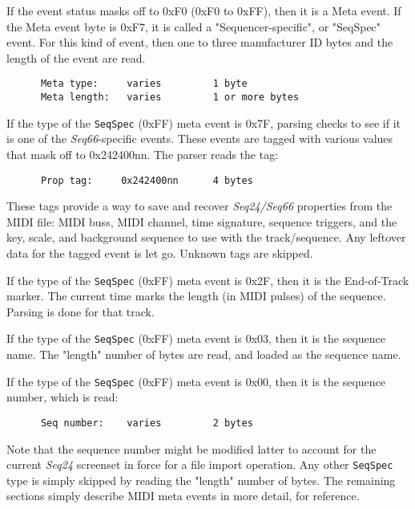    If the event status masks off to 0xF0 (0xF0 to 0xFF), then it is a Meta
   event.  If the Meta event byte is 0xF7, it is called a "Sequencer-specific",
   or "SeqSpec" event.  For this kind of event, then one to three manufacturer
   ID bytes and the length of the event are read.

   \begin{verbatim}
      Meta type:     varies         1 byte
      Meta length:   varies         1 or more bytes
   \end{verbatim}

   If the type of the
   \texttt{SeqSpec} (0xFF) meta event is 0x7F, parsing checks to see
   if it is one of the \textsl{Seq66}-specific events.  These events are tagged
   with various values that mask off to 0x242400nn.  The parser reads the
   tag:

   \begin{verbatim}
      Prop tag:     0x242400nn      4 bytes
   \end{verbatim}

   These tags provide a way to save and recover \textsl{Seq24/Seq66} properties
   from the MIDI file: MIDI buss, MIDI channel, time signature, sequence
   triggers, and the key, scale, and background sequence to use with the
   track/sequence.  Any leftover data for the tagged event is let go.
   Unknown tags are skipped.

   If the type of the
   \texttt{SeqSpec} (0xFF) meta event is 0x2F, then it is the
   End-of-Track marker.  The current time marks the length (in MIDI pulses) of
   the sequence.  Parsing is done for that track.

   If the type of the
   \texttt{SeqSpec} (0xFF) meta event is 0x03, then it is the
   sequence name.  The "length" number of bytes are read, and loaded as the
   sequence name.

   If the type of the
   \texttt{SeqSpec} (0xFF) meta event is 0x00, then it is the
   sequence number, which is read:

   \begin{verbatim}
      Seq number:    varies         2 bytes
   \end{verbatim}

   Note that the sequence number might be modified latter to account for the
   current \textsl{Seq24} screenset in force for a file import operation.
   Any other \texttt{SeqSpec} type is simply skipped by reading the "length"
   number of bytes.
   The remaining sections simply describe MIDI meta events in more detail, for
   reference.

